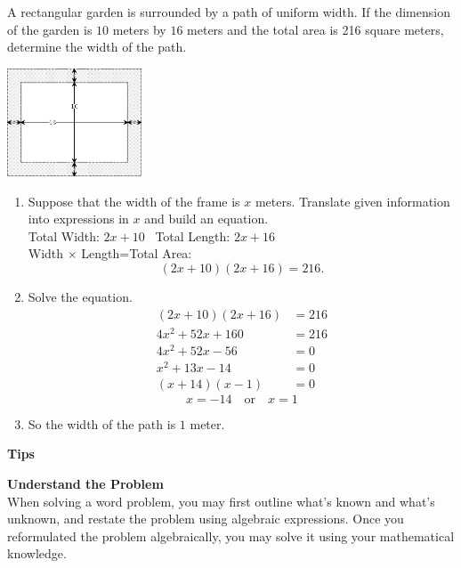 \documentclass[en,12pt]{elegantbook}
\providecommand{\tightlist}{%
  \setlength{\itemsep}{0pt}\setlength{\parskip}{0pt}}
\newenvironment{rmdtip}{
	\par\noindent
	{
		\makebox[-\width][r]{
			\footnotesize\color{red!90}
            \HandRight
			\hspace*{1pt}
		}
			\textbf{
				\color{second}
				\hspace*{3pt}
				Tips 
			}
    }
    \begin{shaded}
    \sffamily
}{
    \par\medskip\ignorespacesafterend
    \end{shaded}
}
\providecommand{\tightlist}{%
  \setlength{\itemsep}{0pt}\setlength{\parskip}{0pt}}
\let\BeginKnitrBlock\begin \let\EndKnitrBlock\end
\begin{document}
\BeginKnitrBlock{example}
\protect\hypertarget{exm:unnamed-chunk-115}{}{\label{exm:unnamed-chunk-115} }
A rectangular garden is surrounded by a path of uniform width. If the dimension of the garden is \(10\) meters by \(16\) meters and the total area is 216 square meters, determine the width of the path.

\includegraphics[width=0.3\textwidth,height=\textheight]{figs/tikz-rectangular-uniform-width.png}\\
\EndKnitrBlock{example}

\BeginKnitrBlock{solution}


\begin{enumerate}
\def\labelenumi{\arabic{enumi}.}
\tightlist
\item
  Suppose that the width of the frame is \(x\) meters. Translate given information into expressions in \(x\) and build an equation.\\
  Total Width: \(2x+10\) ~Total Length: \(2x+16\)\\
  Width \(\times\) Length=Total Area:
  \[(2x+10)(2x+16)=216.\]
\item
  Solve the equation.
  \[
   \begin{aligned}
       (2x+10)(2x+16)&=216\\
       4x^2+52x+160&=216\\
       4x^2+52x-56&=0\\
       x^2+13x-14&=0\\
       (x+14)(x-1)&=0
   \end{aligned}
   \]
  \[
   x = -14\quad \text{or}\quad x = 1
   \]
\item
  So the width of the path is \(1\) meter.
\end{enumerate}
\EndKnitrBlock{solution}

\begin{rmdtip}

\textbf{Understand the Problem}\\
When solving a word problem, you may first outline what's known and what's unknown, and restate the problem using algebraic expressions. Once you reformulated the problem algebraically, you may solve it using your mathematical knowledge.

\end{rmdtip}
\end{document}
